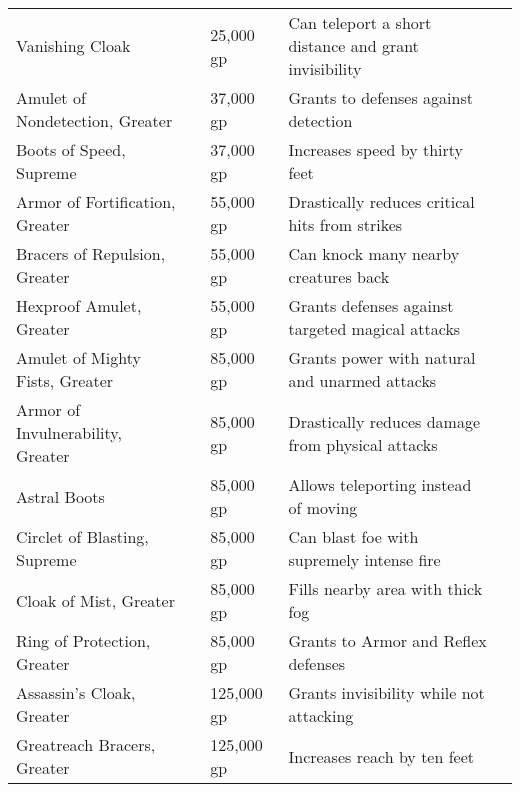 \begin{longtabuwrapper}
\begin{longtabu}{l l l X l}
Vanishing Cloak &  & 25,000 gp & Can teleport a short distance and grant invisibility & \pageref{item:Vanishing Cloak} \\
Amulet of Nondetection, Greater &  & 37,000 gp & Grants  to defenses against detection & \pageref{item:Amulet of Nondetection, Greater} \\
Boots of Speed, Supreme &  & 37,000 gp & Increases speed by thirty feet & \pageref{item:Boots of Speed, Supreme} \\
Armor of Fortification, Greater &  & 55,000 gp & Drastically reduces critical hits from strikes & \pageref{item:Armor of Fortification, Greater} \\
Bracers of Repulsion, Greater &  & 55,000 gp & Can knock many nearby creatures back & \pageref{item:Bracers of Repulsion, Greater} \\
Hexproof Amulet, Greater &  & 55,000 gp & Grants  defenses against targeted magical attacks & \pageref{item:Hexproof Amulet, Greater} \\
Amulet of Mighty Fists, Greater &  & 85,000 gp & Grants  power with natural and unarmed attacks & \pageref{item:Amulet of Mighty Fists, Greater} \\
Armor of Invulnerability, Greater &  & 85,000 gp & Drastically reduces damage from physical attacks & \pageref{item:Armor of Invulnerability, Greater} \\
Astral Boots &  & 85,000 gp & Allows teleporting instead of moving & \pageref{item:Astral Boots} \\
Circlet of Blasting, Supreme &  & 85,000 gp & Can blast foe with supremely intense fire & \pageref{item:Circlet of Blasting, Supreme} \\
Cloak of Mist, Greater &  & 85,000 gp & Fills nearby area with thick fog & \pageref{item:Cloak of Mist, Greater} \\
Ring of Protection, Greater &  & 85,000 gp & Grants  to Armor and Reflex defenses & \pageref{item:Ring of Protection, Greater} \\
Assassin's Cloak, Greater &  & 125,000 gp & Grants invisibility while not attacking & \pageref{item:Assassin's Cloak, Greater} \\
Greatreach Bracers, Greater &  & 125,000 gp & Increases reach by ten feet & \pageref{item:Greatreach Bracers, Greater} \\
\end{longtabu}
\end{longtabuwrapper}
